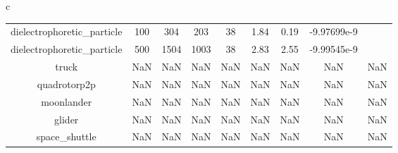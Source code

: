 \documentclass{standalone}
\begin{document}
\begin{tabular}{c}
\begin{tabular}{ccccccccc}
  dielectrophoretic\_particle & 100 & 304 & 203 & 38 & 1.84 & 0.19 & -9.97699e-9 & \color{red}{Infeasible Problem} \\
  dielectrophoretic\_particle & 500 & 1504 & 1003 & 38 & 2.83 & 2.55 & -9.99545e-9 & \color{red}{Infeasible Problem} \\
  truck & NaN & NaN & NaN & NaN & NaN & NaN & NaN & NaN \\
  quadrotorp2p & NaN & NaN & NaN & NaN & NaN & NaN & NaN & NaN \\
  moonlander & NaN & NaN & NaN & NaN & NaN & NaN & NaN & NaN \\
  glider & NaN & NaN & NaN & NaN & NaN & NaN & NaN & NaN \\
  space\_shuttle & NaN & NaN & NaN & NaN & NaN & NaN & NaN & NaN \\\hline
\end{tabular}
\end{tabular}
\end{document}
